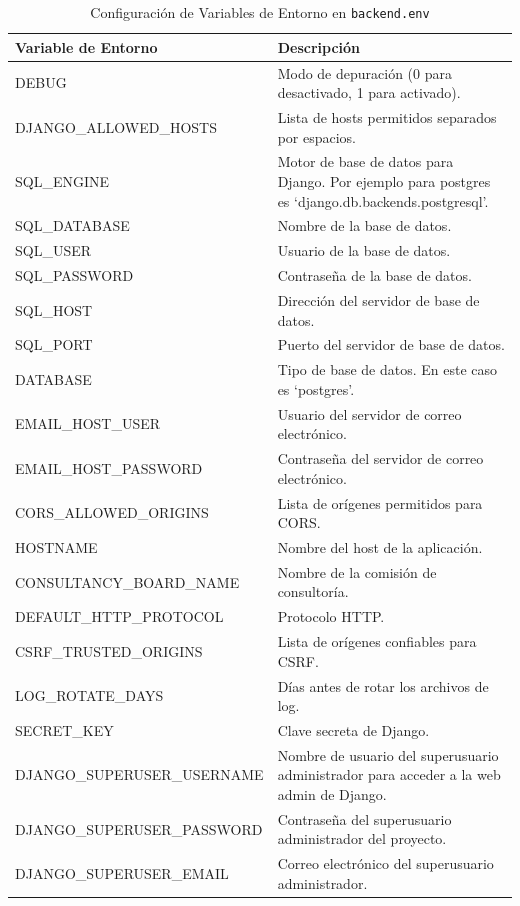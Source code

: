 \begin{table}[H]
    \centering
    \begin{tabular}{|l|p{7cm}|}
    \hline
    \textbf{Variable de Entorno} & \textbf{Descripción} \\
    \hline
    DEBUG & Modo de depuración (0 para desactivado, 1 para activado). \\
    \hline
    DJANGO\_ALLOWED\_HOSTS & Lista de hosts permitidos separados por espacios. \\
    \hline
    SQL\_ENGINE & Motor de base de datos para Django. Por ejemplo para postgres es `django.db.backends.postgresql'.\\
    \hline
    SQL\_DATABASE & Nombre de la base de datos. \\
    \hline
    SQL\_USER & Usuario de la base de datos. \\
    \hline
    SQL\_PASSWORD & Contraseña de la base de datos. \\
    \hline
    SQL\_HOST & Dirección del servidor de base de datos. \\
    \hline
    SQL\_PORT & Puerto del servidor de base de datos. \\
    \hline
    DATABASE & Tipo de base de datos. En este caso es `postgres'.\\
    \hline
    EMAIL\_HOST\_USER & Usuario del servidor de correo electrónico. \\
    \hline
    EMAIL\_HOST\_PASSWORD & Contraseña del servidor de correo electrónico. \\
    \hline
    CORS\_ALLOWED\_ORIGINS & Lista de orígenes permitidos para CORS. \\
    \hline
    HOSTNAME & Nombre del host de la aplicación. \\
    \hline
    CONSULTANCY\_BOARD\_NAME & Nombre de la comisión de consultoría. \\
    \hline
    DEFAULT\_HTTP\_PROTOCOL & Protocolo HTTP. \\
    \hline
    CSRF\_TRUSTED\_ORIGINS & Lista de orígenes confiables para CSRF. \\
    \hline
    LOG\_ROTATE\_DAYS & Días antes de rotar los archivos de log. \\
    \hline
    SECRET\_KEY & Clave secreta de Django. \\
    \hline
    DJANGO\_SUPERUSER\_USERNAME & Nombre de usuario del superusuario administrador para acceder a la web admin de Django. \\
    \hline
    DJANGO\_SUPERUSER\_PASSWORD & Contraseña del superusuario administrador del proyecto. \\
    \hline
    DJANGO\_SUPERUSER\_EMAIL & Correo electrónico del superusuario administrador. \\
    \hline
    \end{tabular}
    \caption{Configuración de Variables de Entorno en \texttt{backend.env}}
    \label{tab:env-variables}
\end{table}


